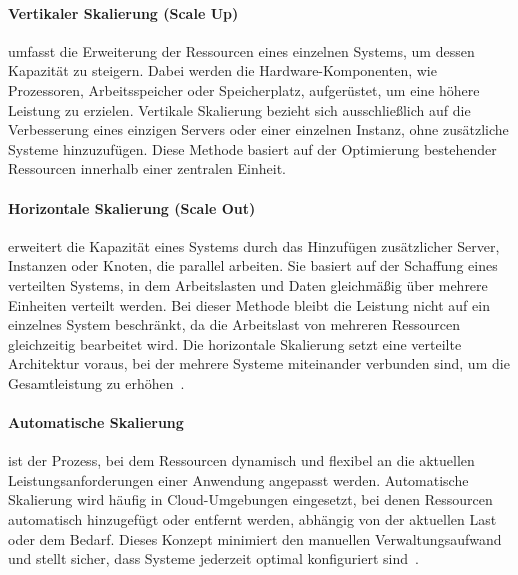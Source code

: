 \paragraph{Vertikaler Skalierung (Scale Up)} umfasst die Erweiterung der Ressourcen eines einzelnen Systems, um dessen
Kapazität zu steigern.
Dabei werden die Hardware-Komponenten, wie Prozessoren, Arbeitsspeicher oder Speicherplatz, aufgerüstet,
um eine höhere Leistung zu erzielen.
Vertikale Skalierung bezieht sich ausschließlich auf die Verbesserung eines einzigen Servers oder einer
einzelnen Instanz, ohne zusätzliche Systeme hinzuzufügen.
Diese Methode basiert auf der Optimierung bestehender Ressourcen innerhalb einer zentralen Einheit.
\paragraph{Horizontale Skalierung (Scale Out)} erweitert die Kapazität eines Systems durch das Hinzufügen
zusätzlicher Server, Instanzen oder Knoten, die parallel arbeiten.
Sie basiert auf der Schaffung eines verteilten Systems, in dem Arbeitslasten und Daten gleichmäßig
über mehrere Einheiten verteilt werden.
Bei dieser Methode bleibt die Leistung nicht auf ein einzelnes System beschränkt, da die Arbeitslast von mehreren
Ressourcen gleichzeitig bearbeitet wird.
Die horizontale Skalierung setzt eine verteilte Architektur voraus, bei der mehrere Systeme miteinander verbunden sind,
um die Gesamtleistung zu erhöhen~\cite{ibm-scaling}.
\paragraph{Automatische Skalierung} ist der Prozess, bei dem Ressourcen dynamisch und flexibel an die aktuellen
Leistungsanforderungen einer Anwendung angepasst werden.
Automatische Skalierung wird häufig in Cloud-Umgebungen eingesetzt, bei denen Ressourcen automatisch hinzugefügt
oder entfernt werden, abhängig von der aktuellen Last oder dem Bedarf.
Dieses Konzept minimiert den manuellen Verwaltungsaufwand und stellt sicher, dass Systeme jederzeit optimal
konfiguriert sind~\cite{mic-autoscaling}.


